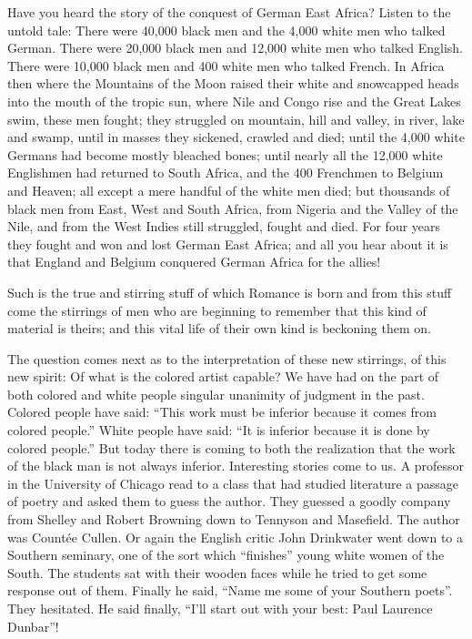 \documentclass[letterpaper,10pt,english]{jupyterBook}
\begin{document}
\sphinxAtStartPar
Have you heard the story of the conquest of German East Africa? Listen to the untold tale: There were 40,000 black men and the 4,000 white men who talked German. There were 20,000 black men and 12,000 white men who talked English. There were 10,000 black men and 400 white men who talked French. In Africa then where the Mountains of the Moon raised their white and snow\sphinxhyphen{}capped heads into the mouth of the tropic sun, where Nile and Congo rise and the Great Lakes swim, these men fought; they struggled on mountain, hill and valley, in river, lake and swamp, until in masses they sickened, crawled and died; until the 4,000 white Germans had become mostly bleached bones; until nearly all the 12,000 white Englishmen had returned to South Africa, and the 400 Frenchmen to Belgium and Heaven; all except a mere handful of the white men died; but thousands of black men from East, West and South Africa, from Nigeria and the Valley of the Nile, and from the West Indies still struggled, fought and died. For four years they fought and won and lost German East Africa; and all you hear about it is that England and Belgium conquered German Africa for the allies!

\sphinxAtStartPar
Such is the true and stirring stuff of which Romance is born and from this stuff come the stirrings of men who are beginning to remember that this kind of material is theirs; and this vital life of their own kind is beckoning them on.

\sphinxAtStartPar
The question comes next as to the interpretation of these new stirrings, of this new spirit: Of what is the colored artist capable? We have had on the part of both colored and white people singular unanimity of judgment in the past. Colored people have said: “This work must be inferior because it comes from colored people.” White people have said: “It is inferior because it is done by colored people.” But today there is coming to both the realization that the work of the black man is not always inferior. Interesting stories come to us. A professor in the University of Chicago read to a class that had studied literature a passage of poetry and asked them to guess the author. They guessed a goodly company from Shelley and Robert Browning down to Tennyson and Masefield. The author was Countée Cullen. Or again the English critic John Drinkwater went down to a Southern seminary, one of the sort which “finishes” young white women of the South. The students sat with their wooden faces while he tried to get some response out of them. Finally he said, “Name me some of your Southern poets”. They hesitated. He said finally, “I’ll start out with your best: Paul Laurence Dunbar”!
\end{document}
